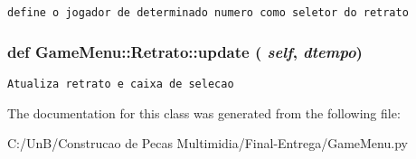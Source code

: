 \begin{footnotesize}\begin{verbatim}define o jogador de determinado numero como seletor do retrato \end{verbatim}
\end{footnotesize}
 \hypertarget{class_game_menu_1_1_retrato_57e91b9027f8e1ea4294c6a4fde49aec}{
\subsubsection[{update}]{\setlength{\rightskip}{0pt plus 5cm}def GameMenu::Retrato::update ( {\em self}, \/   {\em dtempo})}}
\label{class_game_menu_1_1_retrato_57e91b9027f8e1ea4294c6a4fde49aec}




\begin{footnotesize}\begin{verbatim}Atualiza retrato e caixa de selecao \end{verbatim}
\end{footnotesize}
 

The documentation for this class was generated from the following file:\begin{CompactItemize}
\item 
C:/UnB/Construcao de Pecas Multimidia/Final-Entrega/GameMenu.py\end{CompactItemize}

